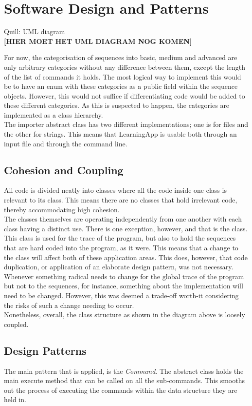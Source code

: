\chapter{Software Design and Patterns}
Quill: UML diagram\\

\textbf{[HIER MOET HET UML DIAGRAM NOG KOMEN]}

For now, the categorisation of sequences into basic, medium and advanced are only arbitrary categories without any difference between them, except the length of the list of commands it holds. The most logical way to implement this would be to have an enum with these categories as a public field within the sequence objects. However, this would not suffice if differentiating code would be added to these different categories. As this is suspected to happen, the categories are implemented as a class hierarchy. \\
The importer abstract class has two different implementations; one is for files and the other for strings. This means that LearningApp is usable both through an input file and through the command line. 

\section{Cohesion and Coupling}
All code is divided neatly into classes where all the code inside one class is relevant to its class. This means there are no classes that hold irrelevant code, thereby accommodating high cohesion. \\
The classes themselves are operating independently from one another with each class having a distinct use. There is one exception, however, and that is the  class. This class is used for the trace of the program, but also to hold the sequences that are hard coded into the program, as it were. This means that a change to the  class will affect both of these application areas. This does, however, that code duplication, or application of an elaborate design pattern, was not necessary. Whenever something radical needs to change for the global trace of the program but not to the sequences, for instance, something about the implementation will need to be changed. However, this was deemed a trade-off worth-it considering the risks of such a change needing to occur. \\
Nonetheless, overall, the class structure as shown in the diagram above is loosely coupled. 

\section{Design Patterns}
The main pattern that is applied, is the \textit{Command}. The  abstract class holds the main execute method that can be called on all the sub-commands. This smooths out the process of executing the commands within the data structure they are held in. \\~\\

